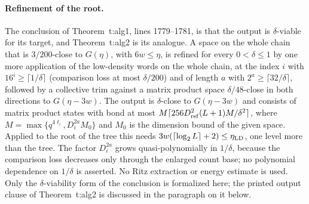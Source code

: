 \documentclass{article}
\begin{document}
\paragraph{Refinement of the root.}
The conclusion of Theorem~t:alg1, lines 1779--1781, is that the output is
$\delta$-viable for its target, and Theorem~t:alg2 is its analogue. A space
on the whole chain that is $3/200$-close to $G(\eta)$, with $6w\le\eta$, is
refined for every $0<\delta\le1$ by one more application of the
low-density words on the whole chain, at the index $i$ with
$16^i\ge\lceil1/\delta\rceil$ (comparison loss at most $\delta/200$) and of
length $a$ with $2^a\ge\lceil32/\delta\rceil$, followed by a collective trim
against a matrix product space $\delta/48$-close in both directions to
$G(\eta-3w)$. The output is $\delta$-close to $G(\eta-3w)$ and consists of
matrix product states with bond at most $M\lceil256D_{\rm ref}^2(L+1)M/
\delta^2\rceil$, where $M=\max\{q^{4\ell_i},D_i^{2a}M_0\}$ and $M_0$ is the
dimension bound of the given space. Applied to the root of the tree this
needs $3w(\lceil\log_2L\rceil+2)\le\eta_{\rm LD}$, one level more than the
tree. The factor $D_i^{2a}$ grows quasi-polynomially in $1/\delta$, because
the comparison loss decreases only through the enlarged count base; no
polynomial dependence on $1/\delta$ is asserted. No Ritz extraction or
energy estimate is used. Only the $\delta$-viability form of the conclusion
is formalized here; the printed output clause of Theorem~t:alg2 is discussed
in the paragraph on it below.
\end{document}
